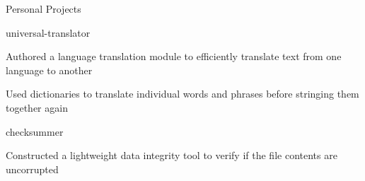 \documentclass{resume} %
\begin{document}
\begin{rSection}{Personal Projects}
  \begin{rSubsection} {universal-translator} {} {} {}
    \item Authored a language translation module to efficiently translate
      text from one language to another
    \item Used dictionaries to translate individual words and phrases before
      stringing them together again
  \end{rSubsection}

  \begin{rSubsection} {checksummer} {} {} {}
    \item Constructed a lightweight data integrity tool to verify if the file
      contents are uncorrupted
  \end{rSubsection}

\end{rSection}
\end{document}
